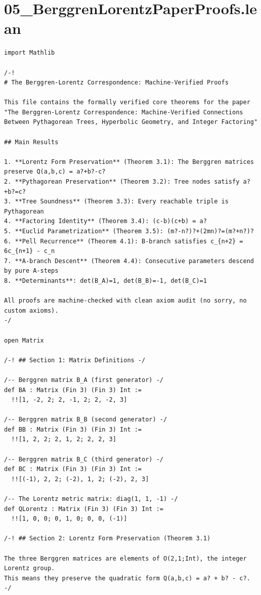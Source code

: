 \documentclass[11pt,twoside,openright]{book}
\theoremstyle{definition}
\theoremstyle{remark}
\begin{document}
\clearpage

\section*{05\_BerggrenLorentzPaperProofs.lean}

\begin{lstlisting}[style=lean]
import Mathlib

/-!
# The Berggren-Lorentz Correspondence: Machine-Verified Proofs

This file contains the formally verified core theorems for the paper
"The Berggren-Lorentz Correspondence: Machine-Verified Connections
Between Pythagorean Trees, Hyperbolic Geometry, and Integer Factoring"

## Main Results

1. **Lorentz Form Preservation** (Theorem 3.1): The Berggren matrices preserve Q(a,b,c) = a?+b?-c?
2. **Pythagorean Preservation** (Theorem 3.2): Tree nodes satisfy a?+b?=c?
3. **Tree Soundness** (Theorem 3.3): Every reachable triple is Pythagorean
4. **Factoring Identity** (Theorem 3.4): (c-b)(c+b) = a?
5. **Euclid Parametrization** (Theorem 3.5): (m?-n?)?+(2mn)?=(m?+n?)?
6. **Pell Recurrence** (Theorem 4.1): B-branch satisfies c_{n+2} = 6c_{n+1} - c_n
7. **A-branch Descent** (Theorem 4.4): Consecutive parameters descend by pure A-steps
8. **Determinants**: det(B_A)=1, det(B_B)=-1, det(B_C)=1

All proofs are machine-checked with clean axiom audit (no sorry, no custom axioms).
-/

open Matrix

/-! ## Section 1: Matrix Definitions -/

/-- Berggren matrix B_A (first generator) -/
def BA : Matrix (Fin 3) (Fin 3) Int :=
  !![1, -2, 2; 2, -1, 2; 2, -2, 3]

/-- Berggren matrix B_B (second generator) -/
def BB : Matrix (Fin 3) (Fin 3) Int :=
  !![1, 2, 2; 2, 1, 2; 2, 2, 3]

/-- Berggren matrix B_C (third generator) -/
def BC : Matrix (Fin 3) (Fin 3) Int :=
  !![(-1), 2, 2; (-2), 1, 2; (-2), 2, 3]

/-- The Lorentz metric matrix: diag(1, 1, -1) -/
def QLorentz : Matrix (Fin 3) (Fin 3) Int :=
  !![1, 0, 0; 0, 1, 0; 0, 0, (-1)]

/-! ## Section 2: Lorentz Form Preservation (Theorem 3.1)

The three Berggren matrices are elements of O(2,1;Int), the integer Lorentz group.
This means they preserve the quadratic form Q(a,b,c) = a? + b? - c?. -/


\end{lstlisting}
\end{document}
